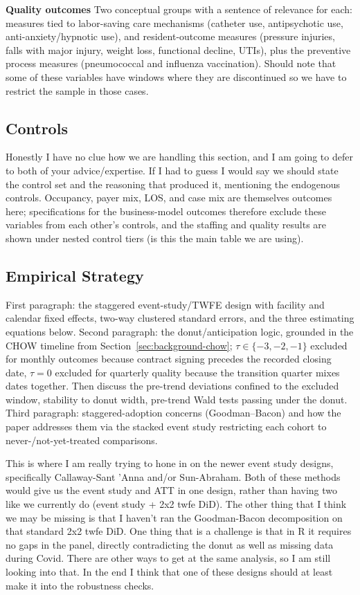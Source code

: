 \documentclass[12pt]{article}
\begin{document}
\medskip
\noindent\textbf{Quality outcomes} Two conceptual groups with a sentence of relevance for each: measures tied to labor-saving care mechanisms (catheter use, antipsychotic use, anti-anxiety/hypnotic use), and resident-outcome measures (pressure injuries, falls with major injury, weight loss, functional decline, UTIs), plus the preventive process measures (pneumococcal and influenza vaccination). Should note that some of these variables have windows where they are discontinued so we have to restrict the sample in those cases.

\subsection{Controls}

Honestly I have no clue how we are handling this section, and I am going to defer to both of your advice/expertise. If I had to guess I would say we should state the control set and the reasoning that produced it, mentioning the endogenous controls. Occupancy, payer mix, LOS, and case mix are themselves outcomes here; specifications for the business-model outcomes therefore exclude these variables from each other's controls, and the staffing and quality results are shown under nested control tiers (is this the main table we are using). 

\subsection{Empirical Strategy}

First paragraph: the staggered event-study/TWFE design with facility and calendar fixed effects, two-way clustered standard errors, and the three estimating equations below. Second paragraph: the donut/anticipation logic, grounded in the CHOW timeline from Section~\ref{sec:background-chow}; $\tau\in\{-3,-2,-1\}$ excluded for monthly outcomes because contract signing precedes the recorded closing date, $\tau=0$ excluded for quarterly quality because the transition quarter mixes dates together. Then discuss the pre-trend deviations confined to the excluded window, stability to donut width, pre-trend Wald tests passing under the donut. Third paragraph: staggered-adoption concerns (Goodman--Bacon) and how the paper addresses them via the stacked event study restricting each cohort to never-/not-yet-treated comparisons. 

This is where I am really trying to hone in on the newer event study designs, specifically Callaway-Sant 'Anna and/or Sun-Abraham. Both of these methods would give us the event study and ATT in one design, rather than having two like we currently do (event study + 2x2 twfe DiD). The other thing that I think we may be missing is that I haven't ran the Goodman-Bacon decomposition on that standard 2x2 twfe DiD. One thing that is a challenge is that in R it requires no gaps in the panel, directly contradicting the donut as well as missing data during Covid. There are other ways to get at the same analysis, so I am still looking into that. In the end I think that one of these designs should at least make it into the robustness checks.
\end{document}
